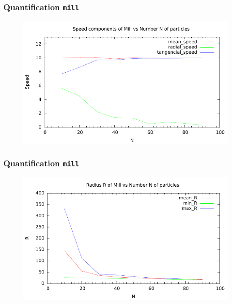 \documentclass[compress]{beamer}
\begin{document}
\begin{frame}
	\frametitle{Quantification \texttt{mill}}
	\begin{figure}[H]
		\includegraphics[width=1. \columnwidth]{../plots/mill_II_speeds_N.pdf}
	\end{figure}	
\end{frame}


\begin{frame}
	\frametitle{Quantification \texttt{mill}}
	
\begin{figure}[H]
		\includegraphics[width=1. \columnwidth]{../plots/mill_II_radius_N.pdf}
\end{figure}

\end{frame}
\end{document}

